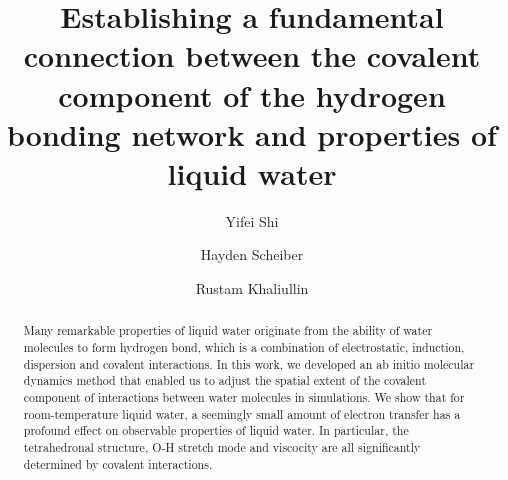 \documentclass[prl,twocolumn,showpacs]{revtex4}
\begin{document}
\newcommand{\ltwid}{\mathrel{\raise.3ex\hbox{$<$\kern-.75em\lower1ex\hbox{$\sim$}}}}
\newcommand{\gtwid}{\mathrel{\raise.3ex\hbox{$>$\kern-.75em\lower1ex\hbox{$\sim$}}}}
\newcommand{\bra}{\langle}
\newcommand{\ket}{\rangle}
\newcommand{\sill}{\psi}
\newcommand{\trace}{{\rm Tr}}
\newcommand{\ntilde}{\tilde{n}}
\newcommand{\stilde}{\tilde{s}}
\newcommand{\atilde}{\tilde{\alpha}}
\newcommand{\new}{\color{red}}
\newcommand{\old}{\color{black}}
\newcommand{\bea}{\begin{eqnarray}}
\newcommand{\eea}{\end{eqnarray}}
\def\nn{\nonumber\\}



\title{Establishing a fundamental connection between the covalent component of the
hydrogen bonding network and properties of liquid water}

\author{Yifei Shi}

\author{Hayden Scheiber}

\author{Rustam Khaliullin}


\begin{abstract}
Many remarkable properties of liquid water originate from the ability of water molecules to form hydrogen bond, which is a combination of electrostatic, induction, dispersion and covalent interactions. In this work, we developed an ab initio molecular dynamics method that enabled us to adjust the spatial extent of the covalent component of interactions between water molecules in simulations. We show that for room-temperature liquid water, a seemingly small amount of electron transfer has a profound effect on observable properties of liquid water. In particular, the tetrahedronal structure, O-H stretch mode and viscocity are all significantly determined by covalent interactions.


\end{abstract}
\maketitle
\end{document}
